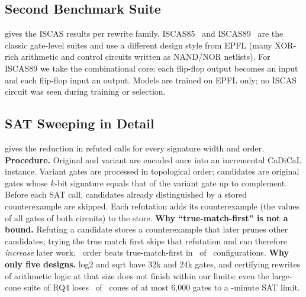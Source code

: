 \FloatBarrier
\subsection{Second Benchmark Suite}\label{app:iscas}

\noindent {} gives the ISCAS results per rewrite family. ISCAS85~\cite{iscas85} and ISCAS89~\cite{iscas89} are the classic gate-level suites and use a
different design style from EPFL (many XOR-rich arithmetic and control circuits written as NAND/NOR netlists).
For ISCAS89 we take the combinational core: each flip-flop output becomes an input and each flip-flop input an
output. Models are trained on EPFL only; no ISCAS circuit was seen during training or selection.

\FloatBarrier
\subsection{SAT Sweeping in Detail}\label{app:sweep}

\noindent {} gives the reduction in refuted calls for every signature width and order.
\noindent\textbf{Procedure.} Original and variant are encoded once into an incremental CaDiCaL instance. Variant
gates are processed in topological order; candidates are original gates whose $k$-bit signature equals that of
the variant gate up to complement. Before each SAT call, candidates already distinguished by a stored
counterexample are skipped. Each refutation adds its counterexample (the values of all gates of both circuits)
to the store. \textbf{Why ``true-match-first'' is not a bound.} Refuting a candidate stores a counterexample
that later prunes other candidates; trying the true match first skips that refutation and can therefore
\emph{increase} later work. \ours\ order beats true-match-first in \SwBeatTrue\ of \SwConfigs\ configurations.
\textbf{Why only five designs.} log2 and sqrt have 32k and 24k gates, and certifying rewrites of arithmetic logic at that
size does not finish within our limits: even the large-cone suite of RQ4 loses \LgTimeout\ of \LgBuilt\ cones of at most 6{,}000
gates to a \LgTimeoutMin-minute SAT limit.

\FloatBarrier
